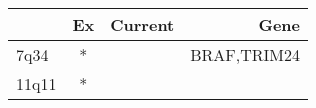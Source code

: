\begin{tabular}{lccr}
\toprule
{} & Ex & Current &         Gene \\
\midrule
7q34  &  * &         &  BRAF,TRIM24 \\
11q11 &  * &         &              \\
\bottomrule
\end{tabular}
